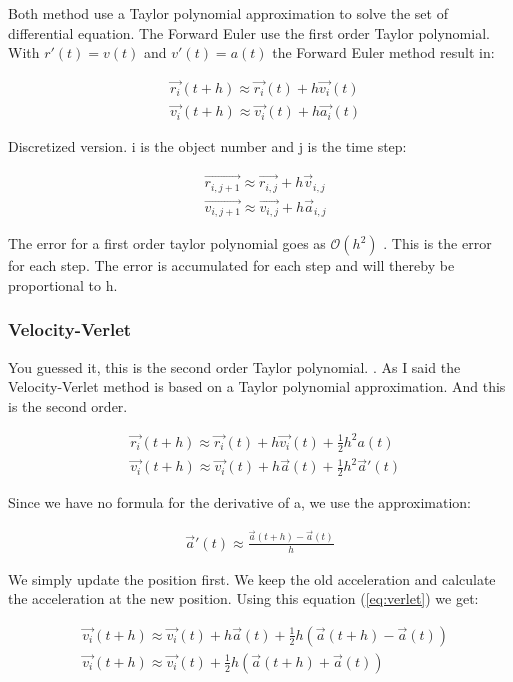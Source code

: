 Both method use a Taylor polynomial approximation to solve the set of differential equation. The Forward Euler use the first order Taylor polynomial. With $r'(t) = v(t)$ and $v'(t) = a(t)$ the Forward Euler method result in: 
 
\begin{align}
	&\vec{r_i}(t+h) \approx \vec{r_i}(t) + h \vec{v_i}(t)
	\\
	&\vec{v_i}(t+h) \approx \vec{v_i}(t) + h \vec{a_i}(t)
\end{align}

Discretized version. i is the object number and j is the time step:

\begin{align*}
	&\vec{r_{i,j+1}} \approx \vec{r_{i,j}} + h \vec{v}_{i,j}
	\\
	&\vec{v_{i,j+1}} \approx \vec{v_{i,j}} + h \vec{a}_{i,j}
\end{align*}

The error for a first order taylor polynomial goes as $\mathcal{O}(h^2)$ \cite{compphys}. This is the error for each step. The error is accumulated for each step and will thereby be proportional to h. 

\subsubsection{Velocity-Verlet}

You guessed it, this is the second order Taylor polynomial. . As I said the Velocity-Verlet method is based on a Taylor polynomial approximation. And this is the second order. 

\begin{align}
	&\vec{r_i}(t+h) \approx \vec{r_i}(t) + h \vec{v_i}(t) + \frac{1}{2} h^2 a(t)
	\\
	&\vec{v_i}(t+h) \approx \vec{v_i}(t) + h \vec{a}(t) + \frac{1}{2} h^2 \vec{a}'(t)
	\label{eq:verlet}
\end{align}

Since we have no formula for the derivative of a, we use the approximation: 

\begin{align*}
	\vec{a}'(t) \approx \frac{\vec{a}(t+h) - \vec{a}(t)}{h}
\end{align*}

We simply update the position first. We keep the old acceleration and calculate the acceleration at the new position.  Using this equation (\ref{eq:verlet}) we get: 

\begin{align*}
	&\vec{v_i}(t+h) \approx \vec{v_i}(t) + h \vec{a}(t) + \frac{1}{2} h(\vec{a}(t+h) - \vec{a}(t))
	\\
	&\vec{v_i}(t+h) \approx \vec{v_i}(t) + \frac{1}{2} h(\vec{a}(t+h) + \vec{a}(t))
\end{align*}

